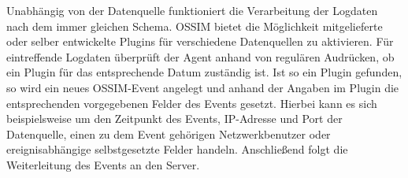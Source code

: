 Unabhängig von der Datenquelle funktioniert die Verarbeitung der Logdaten nach dem immer gleichen Schema. OSSIM bietet die Möglichkeit mitgelieferte oder selber entwickelte Plugins für verschiedene Datenquellen zu aktivieren. Für eintreffende Logdaten überprüft der Agent anhand von regulären Audrücken, ob ein Plugin für das entsprechende Datum zuständig ist. Ist so ein Plugin gefunden, so wird ein neues OSSIM-Event angelegt und anhand der Angaben im Plugin die entsprechenden vorgegebenen Felder des Events gesetzt. Hierbei kann es sich beispielsweise um den Zeitpunkt des Events, IP-Adresse und Port der Datenquelle, einen zu dem Event gehörigen Netzwerkbenutzer oder ereignisabhängige selbstgesetzte Felder handeln. Anschließend folgt die Weiterleitung des Events an den Server.
